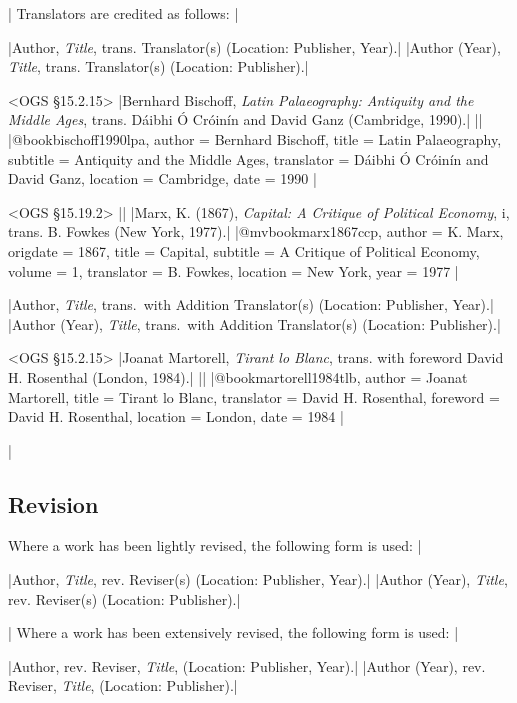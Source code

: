 \documentclass[extrafontsizes,11pt,a4paper,oneside]{memoir}
\newcommand*{\lit}[1]{\textsf{#1}}
\begin{document}
\todoc|
Translators are credited as follows:
|

\specs
|Author, \emph{Title}, \lit{trans.} Translator(s) (Location: Publisher, Year).|%
|Author (Year), \emph{Title}, \lit{trans.} Translator(s) (Location: Publisher).|

\bibexample<OGS \S15.2.15>
|Bernhard Bischoff, \emph{Latin Palaeography: Antiquity and the Middle Ages}, trans. Dáibhi Ó Cróinín and David Ganz (Cambridge, 1990).|%
||%
|@book{bischoff1990lpa,
  author = {Bernhard Bischoff},
  title = {Latin Palaeography},
  subtitle = {Antiquity and the Middle Ages},
  translator = {Dáibhi Ó Cróinín and David Ganz},
  location = {Cambridge},
  date = {1990}
}|

\bibexample<OGS \S15.19.2>
||%
|Marx, K. (1867), \emph{Capital: A Critique of Political Economy}, i, trans. B. Fowkes (New York, 1977).|%
|@mvbook{marx1867ccp,
  author = {K. Marx},
  origdate = {1867},
  title = {Capital},
  subtitle = {A Critique of Political Economy},
  volume = {1},
  translator = {B. Fowkes},
  location = {New York},
  year = {1977}
}|

\specs
|Author, \emph{Title}, \lit{trans.\ with} Addition Translator(s) (Location: Publisher, Year).|%
|Author (Year), \emph{Title}, \lit{trans.\ with} Addition Translator(s) (Location: Publisher).|

\bibexample<OGS \S15.2.15>
|Joanat Martorell, \emph{Tirant lo Blanc}, trans. with foreword David H. Rosenthal (London, 1984).|%
||%
|@book{martorell1984tlb,
  author = {Joanat Martorell},
  title = {Tirant lo Blanc},
  translator = {David H. Rosenthal},
  foreword = {David H. Rosenthal},
  location = {London},
  date = {1984}
}|

\todoc|
\subsection{Revision}

Where a work has been lightly revised, the following form is used:
|

\specs
|Author, \emph{Title}, \lit{rev.} Reviser(s) (Location: Publisher, Year).|%
|Author (Year), \emph{Title}, \lit{rev.} Reviser(s) (Location: Publisher).|%

\todoc|
Where a work has been extensively revised, the following form is used:
|

\specs
|Author, \lit{rev.} Reviser, \emph{Title}, (Location: Publisher, Year).|%
|Author (Year), \lit{rev.} Reviser, \emph{Title}, (Location: Publisher).|
\end{document}
